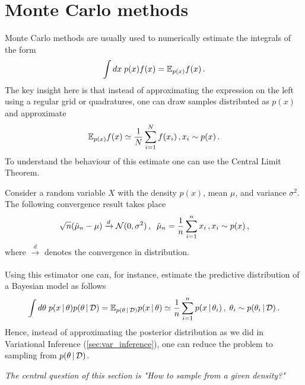 \section{Monte Carlo methods}

Monte Carlo methods are usually used to numerically estimate the integrals of the form
\begin{align}
    \int dx\; p(x)f(x) = \mathbb{E}_{p(x)} f(x)\,.
\end{align}
The key insight here is that instead of approximating the expression on the left using a regular grid or quadratures, one can draw samples distributed as $p(x)$ and approximate
\begin{align}
    \mathbb{E}_{p(x)} f(x) \simeq \frac{1}{N}\sum_{i=1}^N f(x_i)\,, x_i \sim p(x)\,.
\end{align}
To understand the behaviour of this estimate one can use the Central Limit Theorem.
\begin{theorem}
    Consider a random variable $X$ with the density $p(x)$, mean $\mu$, and variance $\sigma^2$. The following convergence result takes place
    \begin{align}
        \sqrt{n}(\hat{\mu}_n-\mu) \xrightarrow[]{d} \mathcal{N}(0,\sigma^2)\,, \;\; \hat{\mu}_n = \frac{1}{n}\sum_{i=1}^n x_i\,, x_i \sim p(x)\,,
    \end{align}
    where $\xrightarrow[]{d}$ denotes the convergence in distribution.
\end{theorem}
Using this estimator one can, for instance, estimate the predictive distribution of a Bayesian model as follows
\begin{align}
    \int d\theta\; p(x\,|\, \theta)p(\theta\,|\, \mathcal{D}) = \mathbb{E}_{p(\theta\,|\, \mathcal{D})}p(x\,|\, \theta) \simeq \frac{1}{n}\sum_{i=1}^n p(x\,|\, \theta_i)\,,\; \theta_i \sim p(\theta_i\,|\, \mathcal{D})\,.
\end{align}
Hence, instead of approximating the posterior distribution as we did in Variational Inference (\cref{sec:var_inference}), one can reduce the problem to sampling from $p(\theta\,|\, \mathcal{D})$.

\begin{mybox}
\begin{center}
    \textit{The central question of this section is "How to sample from a given density?"}
\end{center}
\end{mybox}

